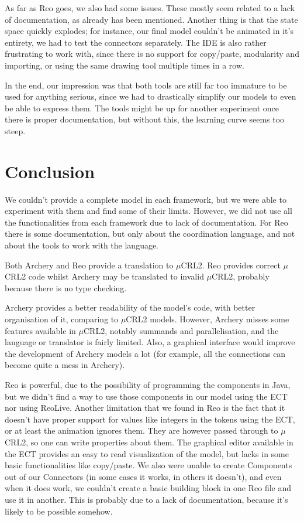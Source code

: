 \documentclass[a4paper]{article}
\newcommand{\ar}{Archery\xspace}
\newcommand{\re}{Reo\xspace}
\newcommand{\mcrl}{$\mu$CRL2\xspace}
\begin{document}
As far as \re goes, we also had some issues. These mostly seem related to a lack
of documentation, as already has been mentioned. Another thing is that the state
space quickly explodes; for instance, our final model couldn't be animated in
it's entirety, we had to test the connectors separately. The IDE is also rather
frustrating to work with, since there is no support for copy/paste, modularity
and importing, or using the same drawing tool multiple times in a row.


In the end, our impression was that both tools are still far too immature to be
used for anything serious, since we had to drastically simplify our models to
even be able to express them. The tools might be up for another experiment once
there is proper documentation, but without this, the learning curve seems too
steep. 



%
%
\section{Conclusion}
We couldn't provide a complete model in each framework, but we were able to
experiment with them and find some of their limits. However, we did not use all the
functionalities from each framework due to lack of documentation. For \re there
is some documentation, but only about the coordination language, and not about
the tools to work with the language.

Both \ar and \re provide a translation to \mcrl. \re provides correct \mcrl
code whilst \ar may be translated to invalid \mcrl, probably because there is
no type checking.

\ar provides a better readability of the model's code, with better organisation
of it, comparing to \mcrl models. However, \ar misses some features available
in \mcrl, notably summands and parallelisation, and the language or translator is
fairly limited. Also, a graphical interface would improve the development of
\ar models a lot (for example, all the connections can become quite a mess in
\ar).


\re is powerful, due to the possibility of programming the components in Java,
but we didn't find a way to use those components in our model using the ECT nor
using ReoLive. Another limitation that we found in \re is the fact that it
doesn't have proper support for values like integers in the tokens using the
ECT, or at least the animation ignores them. They are however passed through to
\mcrl, so one can write properties about them. The graphical editor available in
the ECT provides an easy to read visualization of the model, but lacks in some
basic functionalities like copy/paste. We also were unable to create Components
out of our Connectors (in some cases it works, in others it doesn't), and even
when it does work, we couldn't create a basic building block in one \re file and
use it in another.  This is probably due to a lack of documentation, because
it's likely to be possible somehow.
\end{document}
